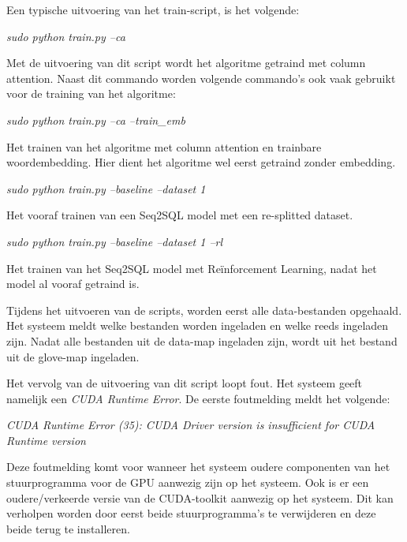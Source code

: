 Een typische uitvoering van het train-script, is het volgende:

\begin{center}
	\textit{sudo python train.py --ca}
\end{center}

Met de uitvoering van dit script wordt het algoritme getraind met column attention. Naast dit commando worden volgende commando's ook vaak gebruikt voor de training van het algoritme:

\begin{center}
	\textit{sudo python train.py --ca --train\_emb}
\end{center}

Het trainen van het algoritme met column attention en trainbare woordembedding. Hier dient het algoritme wel eerst getraind zonder embedding.

\begin{center}
	\textit{sudo python train.py --baseline --dataset 1}
\end{center}

Het vooraf trainen van een Seq2SQL model met een re-splitted dataset. 

\begin{center}
	\textit{sudo python train.py --baseline --dataset 1 --rl}
\end{center}

Het trainen van het Seq2SQL model met Reïnforcement Learning, nadat het model al vooraf getraind is.

Tijdens het uitvoeren van de scripts, worden eerst alle data-bestanden opgehaald. Het systeem meldt welke bestanden worden ingeladen en welke reeds ingeladen zijn. Nadat alle bestanden uit de data-map ingeladen zijn, wordt uit het bestand uit de glove-map ingeladen. 

Het vervolg van de uitvoering van dit script loopt fout. Het systeem geeft namelijk een \textit{CUDA Runtime Error}. De eerste foutmelding meldt het volgende:

\begin{center}
	\textit{CUDA Runtime Error (35): CUDA Driver version is insufficient for CUDA Runtime version}
\end{center}

Deze foutmelding komt voor wanneer het systeem oudere componenten van het stuurprogramma voor de GPU aanwezig zijn op het systeem. Ook is er een oudere/verkeerde versie van de CUDA-toolkit aanwezig op het systeem. Dit kan verholpen worden door eerst beide stuurprogramma's te verwijderen en deze beide terug te installeren.

